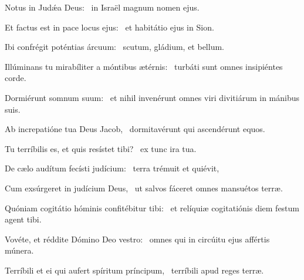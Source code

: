 \item Notus in Judǽa Deus:~\psstar{} in Israël magnum nomen ejus.

\item Et factus est in pace locus ejus:~\psstar{} et habitátio ejus in Sion.

\item Ibi confrégit poténtias árcuum:~\psstar{} scutum, gládium, et bellum.

\item Illúminans tu mirabíliter a móntibus ætérnis:~\psstar{} turbáti sunt omnes insipiéntes corde.

\item Dormiérunt somnum suum:~\psstar{} et nihil invenérunt omnes viri divitiárum in mánibus suis.

\item Ab increpatióne tua Deus Jacob,~\psstar{} dormitavérunt qui a\-scendérunt equos.

\item Tu terríbilis es, et quis resístet tibi?~\psstar{} ex tunc ira tua.

\item De cælo audítum fecísti judícium:~\psstar{} terra trémuit et quiévit,

\item Cum exsúrgeret in judícium Deus,~\psstar{} ut salvos fáceret omnes mansuétos terræ.

\item Quóniam cogitátio hóminis confitébitur tibi:~\psstar{} et relíquiæ cogitatiónis diem festum agent tibi.

\item Vovéte, et réddite Dómino Deo vestro:~\psstar{} omnes qui in circúitu ejus affértis múnera.

\item Terríbili et ei qui aufert spíritum príncipum,~\psstar{} terríbili apud reges terræ.